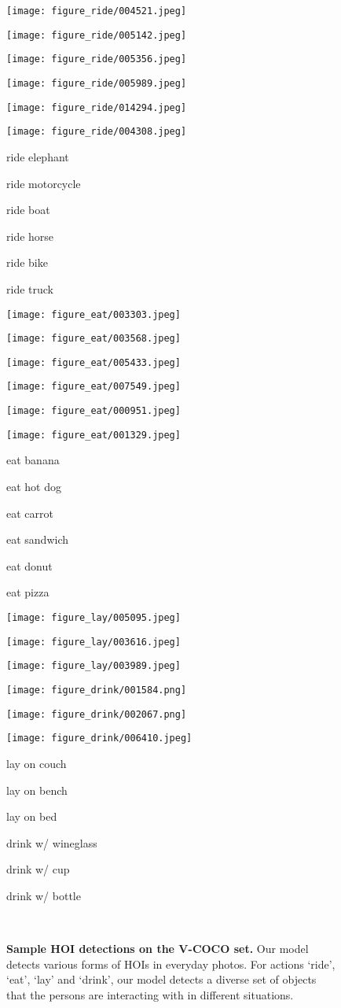 \documentclass{bmvc2k}
\newlength\figmargin
\newlength\figbmargin
\newcommand{\mpage}[2]
{
\begin{minipage}{#1\linewidth}\centering
#2
\end{minipage}
}
\newcommand {\chen}[1]{{\color{red}\textbf{Chen: }#1}\normalfont}
\renewcommand{\chen}[1]{}
\begin{document}
\begin{figure*}[t]
\centering
\footnotesize


\mpage{0.155}{\texttt{[image: figure\_ride/004521.jpeg]}}\hfill
\mpage{0.155}{\texttt{[image: figure\_ride/005142.jpeg]}}\hfill
\mpage{0.155}{\texttt{[image: figure\_ride/005356.jpeg]}}\hfill
\mpage{0.155}{\texttt{[image: figure\_ride/005989.jpeg]}}\hfill
\mpage{0.155}{\texttt{[image: figure\_ride/014294.jpeg]}}\hfill
\mpage{0.155}{\texttt{[image: figure\_ride/004308.jpeg]}}\hfill
\mpage{0.155}{\scriptsize ride     elephant}\hfill
\mpage{0.155}{\scriptsize ride     motorcycle}\hfill
\mpage{0.155}{\scriptsize ride     boat}\hfill
\mpage{0.155}{\scriptsize ride     horse}\hfill
\mpage{0.155}{\scriptsize ride     bike}\hfill
\mpage{0.155}{\scriptsize ride     truck}\hfill


\mpage{0.155}{\texttt{[image: figure\_eat/003303.jpeg]}}\hfill
\mpage{0.155}{\texttt{[image: figure\_eat/003568.jpeg]}}\hfill
\mpage{0.155}{\texttt{[image: figure\_eat/005433.jpeg]}}\hfill
\mpage{0.155}{\texttt{[image: figure\_eat/007549.jpeg]}}\hfill
\mpage{0.155}{\texttt{[image: figure\_eat/000951.jpeg]}}\hfill
\mpage{0.155}{\texttt{[image: figure\_eat/001329.jpeg]}}\hfill
\mpage{0.155}{\scriptsize eat     banana}\hfill
\mpage{0.155}{\scriptsize eat     hot dog}\hfill
\mpage{0.155}{\scriptsize eat     carrot}\hfill
\mpage{0.155}{\scriptsize eat     sandwich}\hfill
\mpage{0.155}{\scriptsize eat     donut}\hfill
\mpage{0.155}{\scriptsize eat     pizza}\hfill


\mpage{0.155}{\texttt{[image: figure\_lay/005095.jpeg]}}\hfill
\mpage{0.155}{\texttt{[image: figure\_lay/003616.jpeg]}}\hfill
\mpage{0.155}{\texttt{[image: figure\_lay/003989.jpeg]}}\hfill
\mpage{0.155}{\texttt{[image: figure\_drink/001584.png]}}\hfill
\mpage{0.155}{\texttt{[image: figure\_drink/002067.png]}}\hfill
\mpage{0.155}{\texttt{[image: figure\_drink/006410.jpeg]}}\hfill
\mpage{0.155}{\scriptsize lay on couch}\hfill
\mpage{0.155}{\scriptsize lay on bench}\hfill
\mpage{0.155}{\scriptsize lay on bed}\hfill
\mpage{0.155}{\scriptsize drink w/ wineglass}\hfill
\mpage{0.155}{\scriptsize drink w/ cup}\hfill
\mpage{0.155}{\scriptsize drink w/ bottle}\hfill
\\
\vspace{\figmargin}
\caption{\textbf{Sample HOI detections on the V-COCO  set.} Our model detects various forms of HOIs in everyday photos. For actions `ride', `eat', `lay' and `drink', our model detects a diverse set of objects that the persons are interacting with in different situations. \chen{The third row doesn't align well.}
}
\vspace{\figbmargin}
\label{fig:one_action}
\end{figure*}
\end{document}
